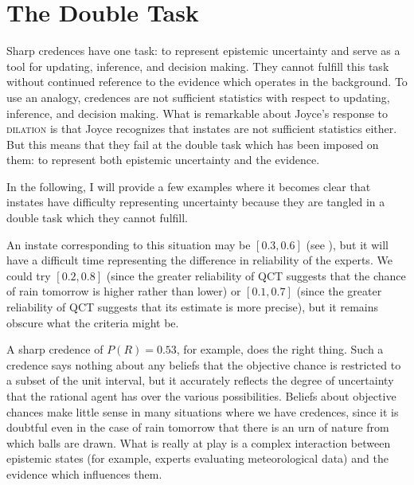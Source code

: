 \documentclass[11pt]{article}
\begin{document}
\section{The Double Task}
\label{TheDoubleTask}

Sharp credences have one task: to represent epistemic uncertainty and
serve as a tool for updating, inference, and decision making. They
cannot fulfill this task without continued reference to the evidence
which operates in the background. To use an analogy, credences are not
sufficient statistics with respect to updating, inference, and
decision making. What is remarkable about Joyce's response to
\textsc{dilation} is that Joyce recognizes that instates are not
sufficient statistics either. But this means that they fail at the
double task which has been imposed on them: to represent both
epistemic uncertainty and the evidence.

In the following, I will provide a few examples where it becomes clear
that instates have difficulty representing uncertainty because they
are tangled in a double task which they cannot fulfill.


An instate corresponding to this situation may be $[0.3,0.6]$ (see
), but it will have a difficult time
representing the difference in reliability of the experts. We could
try $[0.2,0.8]$ (since the greater reliability of QCT suggests that
the chance of rain tomorrow is higher rather than lower) or
$[0.1,0.7]$ (since the greater reliability of QCT suggests that its
estimate is more precise), but it remains obscure what the criteria
might be.

A sharp credence of $P(R)=0.53$, for example, does the right thing.
Such a credence says nothing about any beliefs that the objective
chance is restricted to a subset of the unit interval, but it
accurately reflects the degree of uncertainty that the rational agent
has over the various possibilities. Beliefs about objective chances
make little sense in many situations where we have credences, since it
is doubtful even in the case of rain tomorrow that there is an urn of
nature from which balls are drawn. What is really at play is a complex
interaction between epistemic states (for example, experts evaluating
meteorological data) and the evidence which influences them.
\end{document}
